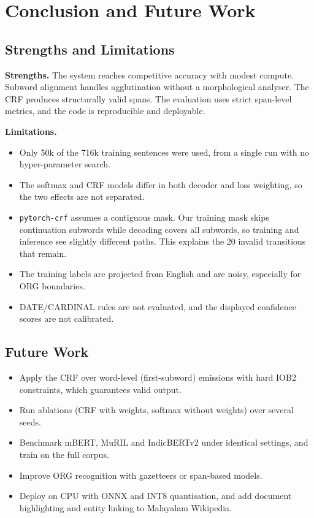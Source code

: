 \chapter{Conclusion and Future Work}\label{ch:concl}

\section{Strengths and Limitations}

\textbf{Strengths.} The system reaches competitive accuracy with modest
compute. Subword alignment handles agglutination without a morphological
analyser. The CRF produces structurally valid spans. The evaluation uses
strict span-level metrics, and the code is reproducible and deployable.

\textbf{Limitations.}
\begin{itemize}
  \item Only 50k of the 716k training sentences were used, from a single
  run with no hyper-parameter search.
  \item The softmax and CRF models differ in both decoder and loss
  weighting, so the two effects are not separated.
  \item \texttt{pytorch-crf} assumes a contiguous mask. Our training mask
  skips continuation subwords while decoding covers all subwords, so training
  and inference see slightly different paths. This explains the 20 invalid
  transitions that remain.
  \item The training labels are projected from English and are noisy,
  especially for ORG boundaries.
  \item DATE/CARDINAL rules are not evaluated, and the displayed confidence
  scores are not calibrated.
\end{itemize}

\section{Future Work}

\begin{itemize}
  \item Apply the CRF over word-level (first-subword) emissions with hard
  IOB2 constraints, which guarantees valid output.
  \item Run ablations (CRF with weights, softmax without weights) over
  several seeds.
  \item Benchmark mBERT, MuRIL and IndicBERTv2 under identical settings, and
  train on the full corpus.
  \item Improve ORG recognition with gazetteers or span-based models.
  \item Deploy on CPU with ONNX and INT8 quantisation, and add document
  highlighting and entity linking to Malayalam Wikipedia.
\end{itemize}


